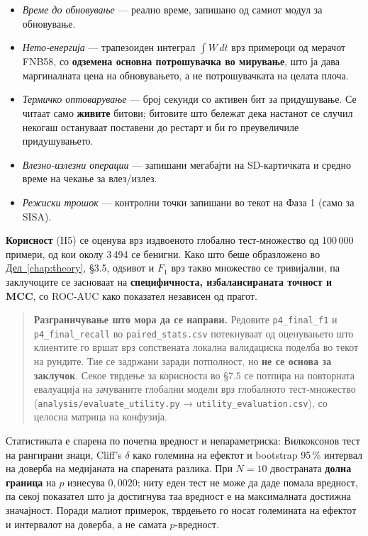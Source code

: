 \begin{itemize}
  \item \emph{Време до обновување} --- реално време, запишано од самиот модул за обновување.
  \item \emph{Нето-енергија} --- трапезоиден интеграл $\int W\,dt$ врз примероци од мерачот FNB58, со \textbf{одземена основна потрошувачка во мирување}, што ја дава маргиналната цена на обновувањето, а не потрошувачката на целата плоча.
  \item \emph{Термичко оптоварување} --- број секунди со активен бит за придушување. Се читаат само \textbf{живите} битови; битовите што бележат дека настанот се случил некогаш остануваат поставени до рестарт и би го преувеличиле придушувањето.
  \item \emph{Влезно-излезни операции} --- запишани мегабајти на SD-картичката и средно време на чекање за влез/излез.
  \item \emph{Режиски трошок} --- контролни точки запишани во текот на Фаза 1 (само за SISA).
\end{itemize}

\textbf{Корисност} (H5) се оценува врз издвоеното глобално тест-множество од 100\,000 примери, од
кои околу 3\,494 се бенигни. Како што беше образложено во \hyperref[chap:theory]{Дел~\ref*{chap:theory}}, §3.5, одѕивот и
$F_1$ врз такво множество се тривијални, па заклучоците се засноваат на \textbf{специфичноста,
избалансираната точност и MCC}, со ROC-AUC како показател независен од прагот.

\begin{quote}
\textbf{Разграничување што мора да се направи.} Редовите \texttt{p4\_final\_f1} и \texttt{p4\_final\_recall} во
\texttt{paired\_stats.csv} потекнуваат од оценувањето што клиентите го вршат врз сопствената
локална валидациска поделба во текот на рундите. Тие се задржани заради потполност, но
\textbf{не се основа за заклучок}. Секое тврдење за корисноста во §7.5 се потпира на
повторната евалуација на зачуваните глобални модели врз глобалното тест-множество
(\texttt{analysis/evaluate\_utility.py} → \texttt{utility\_evaluation.csv}), со целосна матрица на конфузија.
\end{quote}

Статистиката е спарена по почетна вредност и непараметриска: Вилкоксонов тест на рангирани
знаци, Cliff's $\delta$ како големина на ефектот и bootstrap 95\,\% интервал на доверба на
медијаната на спарената разлика. При $N = 10$ двостраната \textbf{долна граница} на $p$ изнесува
$0{,}0020$; ниту еден тест не може да даде помала вредност, па секој показател што ја
достигнува таа вредност е на максималната достижна значајност. Поради малиот примерок,
тврдењето го носат големината на ефектот и интервалот на доверба, а не самата $p$-вредност.

